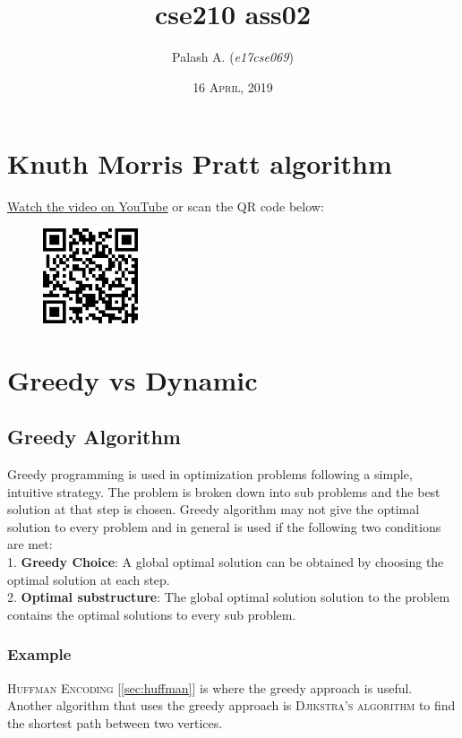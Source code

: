 \documentclass{article}
\title{\textbf{cse210 ass02}}
\author{Palash A. (\textit{e17cse069})}
\date{\textsc{16 April, 2019}}
\begin{document}
\maketitle

\section{Knuth Morris Pratt algorithm}
\href{https://rebrand.ly/kmp-pa5795}{Watch the video on YouTube} or scan the QR code below:
\begin{figure}[H]
    \centering
    \includegraphics[width=0.25\textwidth]{kmp_qr.png}
    \label{fig:qr}
\end{figure}

\section{Greedy vs Dynamic}

\subsection{Greedy Algorithm}
Greedy programming is used in optimization problems following a simple, intuitive strategy. The problem is broken down into sub problems and the best solution at that step is chosen. Greedy algorithm may not give the optimal solution to every problem and in general is used if the following two conditions are met: \\
1. \textbf{Greedy Choice}: A global optimal solution can be obtained by choosing the optimal solution at each step. \\
2. \textbf{Optimal substructure}: The global optimal solution solution to the problem contains the optimal solutions to every sub problem.

\subsubsection{Example}
\textsc{Huffman Encoding} [\ref{sec:huffman}] is where the greedy approach is useful. Another algorithm that uses the greedy approach is \textsc{Djikstra's algorithm} to find the shortest path between two vertices.
\end{document}
